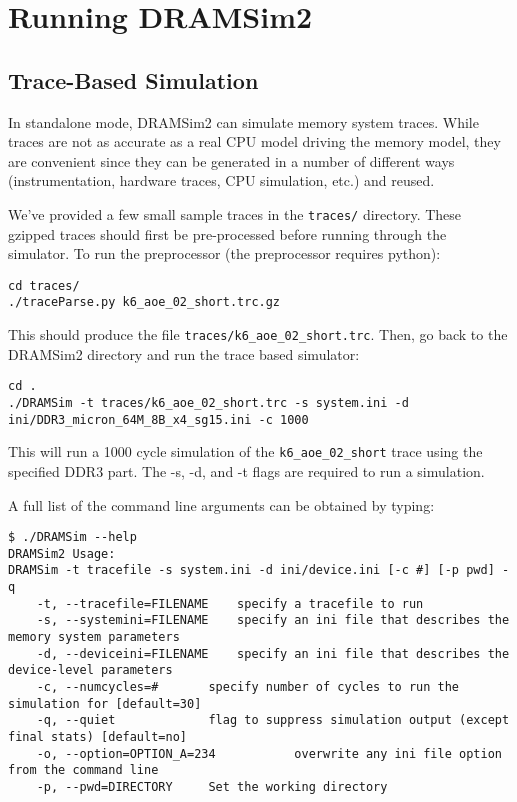 \documentclass[11pt]{article}
\begin{document}
\section{Running DRAMSim2}
\begin{minipage}{\textwidth}
\subsection{Trace-Based Simulation}

In standalone mode, DRAMSim2 can simulate memory system traces. While traces are not as accurate
as a real CPU model driving the memory model, they are convenient since they can be generated in a number of different
ways (instrumentation, hardware traces, CPU simulation, etc.) and reused. 

We've provided a few small sample traces in the \texttt{traces/} directory. These gzipped
traces should first be pre-processed before running through the simulator. 
To run the preprocessor (the preprocessor requires python): 
\begin{lstlisting}
cd traces/
./traceParse.py k6_aoe_02_short.trc.gz
\end{lstlisting}
	This should produce the file \texttt{traces/k6\_aoe\_02\_short.trc}. Then, go back to the DRAMSim2 directory and run the trace based simulator:

\begin{lstlisting}
cd .
./DRAMSim -t traces/k6_aoe_02_short.trc -s system.ini -d ini/DDR3_micron_64M_8B_x4_sg15.ini -c 1000
\end{lstlisting}
	This will run a 1000 cycle simulation of the \texttt{k6\_aoe\_02\_short} trace using 
	the specified DDR3 part. The -s, -d, and -t flags are required to run a simulation.

	A full list of the command line arguments can be obtained by typing:
\begin{lstlisting}
$ ./DRAMSim --help
DRAMSim2 Usage: 
DRAMSim -t tracefile -s system.ini -d ini/device.ini [-c #] [-p pwd] -q
	-t, --tracefile=FILENAME 	specify a tracefile to run  
	-s, --systemini=FILENAME 	specify an ini file that describes the memory system parameters  
	-d, --deviceini=FILENAME 	specify an ini file that describes the device-level parameters
	-c, --numcycles=# 		specify number of cycles to run the simulation for [default=30] 
	-q, --quiet 			flag to suppress simulation output (except final stats) [default=no]
	-o, --option=OPTION_A=234			overwrite any ini file option from the command line
	-p, --pwd=DIRECTORY		Set the working directory


\end{lstlisting}
\end{minipage}
\end{document}
